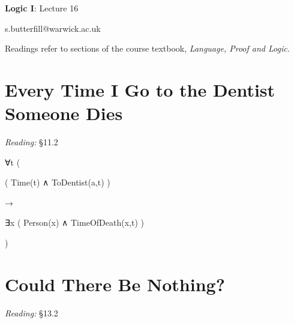 \documentclass[12pt]{extarticle}
\date{}
\makeatletter
\def \ititle {Origins of Mind}
\def \isubtitle {Lecture 08}
\def \iemail{s.butterfill@warwick.ac.uk}
\makeatother
\begin{document}

\begin{multicols*}{3}

\setlength\footnotesep{1em}







\def \ititle {Logic I}
 
\def \isubtitle {Lecture 16}
 
\begin{center}
 
{\Large
 
\textbf{\ititle}: \isubtitle
 
}
 
 
 
\iemail %
 
\end{center}
 
Readings refer to sections of the course textbook, \emph{Language, Proof and Logic}.
 
 
 
\section{Every Time I Go to the Dentist Someone Dies}
 
\emph{Reading:} §11.2
 
∀t (
 
\hspace{5mm} ( Time(t) ∧ ToDentist(a,t) )
 
\hspace{5mm} →
 
\hspace{5mm} ∃x ( Person(x) ∧ TimeOfDeath(x,t) )
 
)
 
 
 
\section{Could There Be Nothing?}
 
\emph{Reading:} §13.2
 

\end{multicols*}
\end{document}
